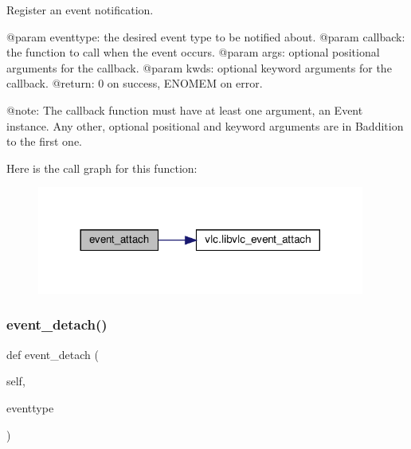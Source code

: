 \begin{DoxyVerb}Register an event notification.

@param eventtype: the desired event type to be notified about.
@param callback: the function to call when the event occurs.
@param args: optional positional arguments for the callback.
@param kwds: optional keyword arguments for the callback.
@return: 0 on success, ENOMEM on error.

@note: The callback function must have at least one argument,
an Event instance.  Any other, optional positional and keyword
arguments are in B{addition} to the first one.
\end{DoxyVerb}
 Here is the call graph for this function\+:
\nopagebreak
\begin{figure}[H]
\begin{center}
\leavevmode
\includegraphics[width=305pt]{classvlc_1_1_event_manager_a969b667ff0326d1baa70343bc882c29d_cgraph}
\end{center}
\end{figure}
\mbox{\label{classvlc_1_1_event_manager_a9163e98110a74e53366cecc73ac10a55}} 
\subsubsection{\texorpdfstring{event\+\_\+detach()}{event\_detach()}}
{\footnotesize\ttfamily def event\+\_\+detach (\begin{DoxyParamCaption}\item[{}]{self,  }\item[{}]{eventtype }\end{DoxyParamCaption})}

